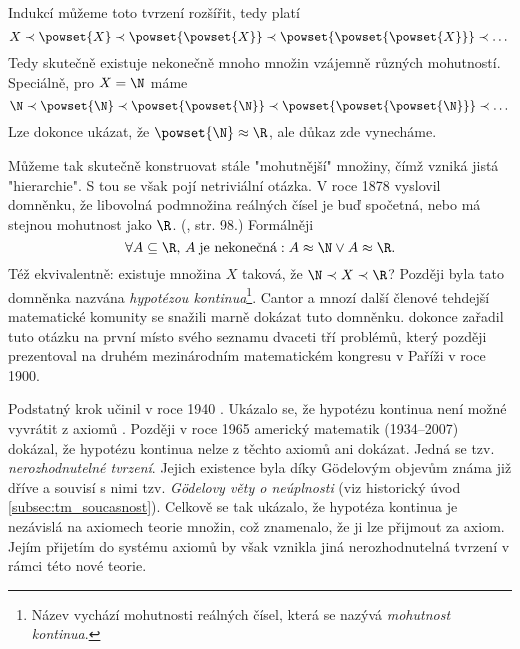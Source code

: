 \begin{remark}
    Indukcí můžeme toto tvrzení rozšířit, tedy platí
    \begin{equation*}
        X\prec\powset{X}\prec\powset{\powset{X}}\prec\powset{\powset{\powset{X}}}\prec\dots
    \end{equation*}
    Tedy skutečně existuje nekonečně mnoho množin vzájemně různých mohutností. Speciálně, pro $X=\N$ máme
    \begin{equation*}
        \N\prec\powset{\N}\prec\powset{\powset{\N}}\prec\powset{\powset{\powset{\N}}}\prec\dots
    \end{equation*}
    Lze dokonce ukázat, že $\powset{\N}\approx\R$, ale důkaz zde vynecháme.
\end{remark}
\medskip

Můžeme tak skutečně konstruovat stále "mohutnější" množiny, čímž vzniká jistá "hierarchie". S tou se však pojí netriviální otázka. V roce 1878 vyslovil  domněnku, že libovolná podmnožina reálných čísel je buď spočetná, nebo má stejnou mohutnost jako $\R$. (\cite{BalcarStepanek1986}, str. 98.) Formálněji
\begin{equation*}
    \forall A\subseteq\R,\,A\;\text{je nekonečná}: A\approx\N \lor A\approx\R.
\end{equation*}
Též ekvivalentně: existuje množina $X$ taková, že $\N\prec X\prec\R$? Později byla tato domněnka nazvána \emph{hypotézou kontinua}\footnote{Název vychází mohutnosti reálných čísel, která se nazývá \emph{mohutnost kontinua}.}. Cantor a mnozí další členové tehdejší matematické komunity se snažili marně dokázat tuto domněnku.  dokonce zařadil tuto otázku na první místo svého seznamu dvaceti tří problémů, který později prezentoval na druhém mezinárodním matematickém kongresu v Paříži v roce 1900.\par
Podstatný krok učinil v roce 1940 . Ukázalo se, že hypotézu kontinua není možné vyvrátit z axiomů \ZF{}. Později v roce 1965 americký matematik  (1934--2007) dokázal, že hypotézu kontinua nelze z těchto axiomů ani dokázat. Jedná se tzv. \emph{nerozhodnutelné tvrzení}. Jejich existence byla díky Gödelovým objevům známa již dříve a souvisí s nimi tzv. \emph{Gödelovy věty o neúplnosti} (viz historický úvod \ref{subsec:tm_soucasnost}). Celkově se tak ukázalo, že hypotéza kontinua je nezávislá na axiomech teorie množin, což znamenalo, že ji lze přijmout za axiom. Jejím přijetím do systému axiomů by však vznikla jiná nerozhodnutelná tvrzení v rámci této nové teorie.